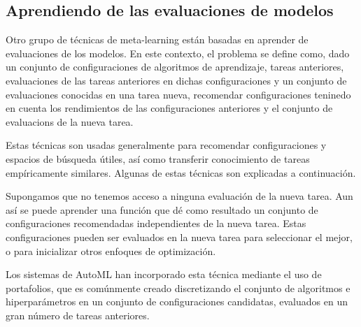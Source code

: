 \documentclass[a4paper,12pt]{article}
\begin{document}
\subsection{Aprendiendo de las evaluaciones de modelos}\label{subsec:mtl_automl_evaluations}

Otro grupo de técnicas de meta-learning están basadas en aprender de evaluaciones de los modelos. En este contexto, el problema se define como, dado un conjunto de configuraciones de algoritmos de aprendizaje, tareas anteriores, evaluaciones de las tareas anteriores en dichas configuraciones y un conjunto de evaluaciones conocidas en una tarea nueva, recomendar configuraciones teninedo en cuenta los rendimientos de las configuraciones anteriores y el conjunto de evaluacions de la nueva tarea.

Estas técnicas son usadas generalmente para recomendar configuraciones y espacios de búsqueda útiles, así como transferir conocimiento de tareas empíricamente similares. Algunas de estas técnicas son explicadas a continuación. 

Supongamos que no tenemos acceso a ninguna evaluación de la nueva tarea. Aun así se puede aprender una función que dé como resultado un conjunto de configuraciones recomendadas independientes de la nueva tarea. Estas configuraciones pueden ser evaluados en la nueva tarea para seleccionar el mejor, o para inicializar otros enfoques de optimización.

Los sistemas de AutoML han incorporado esta técnica mediante el uso de portafolios, que es comúnmente creado discretizando el conjunto de algoritmos e hiperparámetros en un conjunto de configuraciones candidatas, evaluados en un gran número de tareas anteriores.
\end{document}
